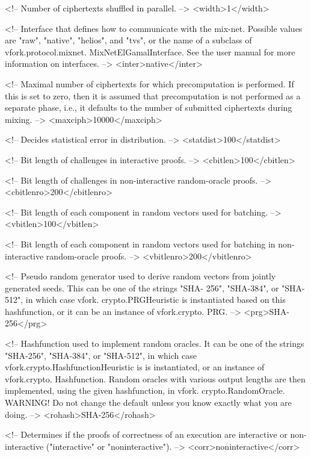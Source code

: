    <!-- Number of ciphertexts shuffled in parallel. -->
   <width>1</width>

   <!-- Interface that defines how to communicate with the mix-net. 
        Possible values are "raw", "native", "helios", and "tvs", or 
        the name of a subclass of vfork.protocol.mixnet.
        MixNetElGamalInterface. See the user manual for more 
        information on interfaces. -->
   <inter>native</inter>

   <!-- Maximal number of ciphertexts for which precomputation is 
        performed. If this is set to zero, then it is assumed that 
        precomputation is not performed as a separate phase, i.e., it 
        defaults to the number of submitted ciphertexts during mixing. 
        -->
   <maxciph>10000</maxciph>

   <!-- Decides statistical error in distribution. -->
   <statdist>100</statdist>

   <!-- Bit length of challenges in interactive proofs. -->
   <cbitlen>100</cbitlen>

   <!-- Bit length of challenges in non-interactive random-oracle 
        proofs. -->
   <cbitlenro>200</cbitlenro>

   <!-- Bit length of each component in random vectors used for 
        batching. -->
   <vbitlen>100</vbitlen>

   <!-- Bit length of each component in random vectors used for 
        batching in non-interactive random-oracle proofs. -->
   <vbitlenro>200</vbitlenro>

   <!-- Pseudo random generator used to derive random vectors from 
        jointly generated seeds. This can be one of the strings "SHA-
        256", "SHA-384", or "SHA-512", in which case vfork.
        crypto.PRGHeuristic is instantiated based on this 
        hashfunction, or it can be an instance of vfork.crypto.
        PRG. -->
   <prg>SHA-256</prg>

   <!-- Hashfunction used to implement random oracles. It can be one 
        of the strings "SHA-256", "SHA-384", or "SHA-512", in which 
        case vfork.crypto.HashfunctionHeuristic is is 
        instantiated, or an instance of vfork.crypto.
        Hashfunction. Random oracles with various output lengths are 
        then implemented, using the given hashfunction, in vfork.
        crypto.RandomOracle.
        WARNING! Do not change the default unless you know exactly 
        what you are doing. -->
   <rohash>SHA-256</rohash>

   <!-- Determines if the proofs of correctness of an execution are 
        interactive or non-interactive ("interactive" or 
        "noninteractive"). -->
   <corr>noninteractive</corr>

